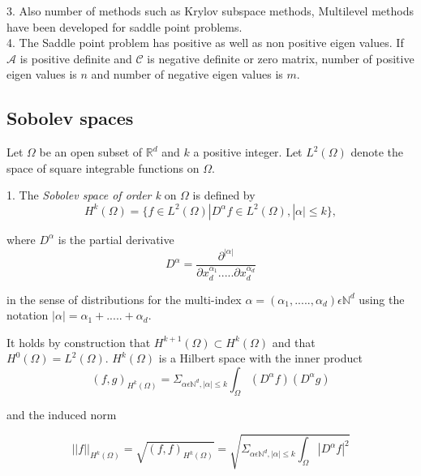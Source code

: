 \documentclass[a4paper,12pt]{book}
\begin{document}
3. Also number of methods such as Krylov subspace methods, Multilevel methods have been developed for saddle point problems.\\

4. The Saddle point problem has positive as well as non positive eigen values. If $\mathcal{A}$ is positive definite and $\mathcal{C}$ is negative definite or zero matrix, number of positive eigen values is $n$ and number of negative eigen values is $m$. \\

\subsection{Sobolev spaces} \cite{crbm}

Let $\Omega$ be an open subset of $\mathbb{R}^d$ and $k$ a positive integer. Let $L^2(\Omega)$ denote the space of square integrable functions on $\Omega$. 

1. The \textit{Sobolev space of order k} on $\Omega$ is defined by\\
\begin{equation}
H^k (\Omega) = \lbrace f \in L^2 (\Omega) | D^\alpha f \in L^2 (\Omega), |\alpha| \leq k \rbrace ,
\end{equation} 

where $D^\alpha$ is the partial derivative
\begin{equation}
D^\alpha = \frac{\partial^{|\alpha|}}{\partial x_d^{\alpha_1} ..... \partial x_d^{\alpha_d}}
\end{equation}

in the sense of distributions for the multi-index $\alpha = (\alpha_1,.....,\alpha_d) \epsilon \mathbb{N}^d$ using the notation $|\alpha| = \alpha_1 + ..... + \alpha_d $.

It holds by construction that $H^{k+1}(\Omega) \subset H^k (\Omega)$ and that $H^0 (\Omega) = L^2 (\Omega)$. $H^k(\Omega)$ is a Hilbert space with the inner product
\begin{equation}
(f,g)_{H^k(\Omega)} = \Sigma_{\alpha \epsilon \mathbb{N}^d, |\alpha| \leq k} \int_\Omega (D^\alpha f) (D^\alpha g)
\end{equation}

and the induced norm 

\begin{equation}
||f||_{H^k (\Omega)} = \sqrt{(f,f)_{H^k(\Omega)}} = \sqrt{\Sigma_{\alpha \epsilon \mathbb{N}^d, |\alpha| \leq k} \int_\Omega |D^\alpha f|^2}
\end{equation}
\end{document}

